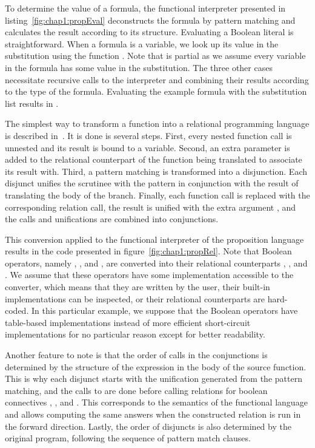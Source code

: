 To determine the value of a formula, the functional interpreter presented in listing~\ref{fig:chap1:propEval} deconstructs the formula by pattern matching and calculates the result according to its structure. 
Evaluating a Boolean literal is straightforward.
When a formula is a variable, we look up its value in the substitution using the function . 
Note that  is partial as we assume every variable in the formula has some value in the substitution. 
The three other cases necessitate recursive calls to the interpreter and combining their results according to the type of the formula. 
Evaluating the example formula with the substitution list  results in .



The simplest way to transform a function into a relational programming language is described in~\cite{byrd2009relational}. 
It is done is several steps. 
First, every nested function call is unnested and its result is bound to a variable. 
Second, an extra parameter  is added to the relational counterpart of the function being translated to associate its result with. 
Third, a pattern matching is transformed into a disjunction. 
Each disjunct unifies the scrutinee with the pattern in conjunction with the result of translating the body of the branch. 
Finally, each function call is replaced with the corresponding relation call, the result is unified with the extra argument , and the calls and unifications are combined into conjunctions. 

This conversion applied to the functional interpreter of the proposition language results in the code presented in figure~\ref{fig:chap1:propRel}. 
Note that Boolean operators, namely \code{\&\&}, \code{||}, and , are converted into their relational counterparts , , and .
We assume that these operators have some implementation accessible to the converter, which means that they are written by the user, their built-in implementations can be inspected, or their relational counterparts are hard-coded. 
In this particular example, we suppose that the Boolean operators have table-based implementations instead of more efficient short-circuit implementations for no particular reason except for better readability. 

Another feature to note is that the order of calls in the conjunctions is determined by the structure of the expression in the body of the source function. 
This is why each disjunct starts with the unification generated from the pattern matching, and the calls to  are done before calling relations for boolean connectives , , and . 
This corresponds to the semantics of the functional language and allows computing the same answers when the constructed relation is run in the forward direction. 
Lastly, the order of disjuncts is also determined by the original program, following the sequence of pattern match clauses. 

